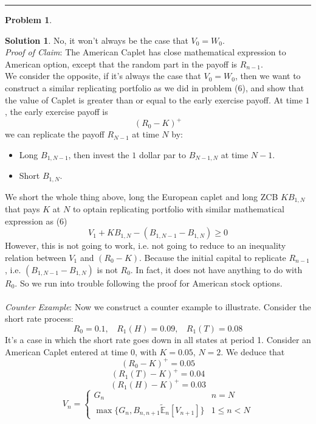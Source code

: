 \documentclass[a4paper, 10pt]{article}
\theoremstyle{definition}
\newtheorem{problem}{Problem}
\theoremstyle{hSol}
\newtheorem*{solution}{Solution}
\begin{document}
\noindent\rule{16cm}{0.4pt}
\begin{problem} 
\end{problem}
\begin{solution} No, it won't always be the case that $V_0=W_0$. \\
\textit{Proof of Claim}: The American Caplet has close mathematical expression to American option, except that the random part in the payoff is $R_{n-1}$.\\
We consider the opposite, if it's always the case that $V_0=W_0$, then we want to construct a similar replicating portfolio as we did in problem (6), and show that the value of Caplet is greater than or equal to the early exercise payoff. At time $1$, the early exercise payoff is
$$
(R_0 - K)^+
$$
we can replicate the payoff $R_{N-1}$ at time $N$ by:
\begin{itemize}
  \item Long $B_{1,N-1}$, then invest the $1$ dollar par to $B_{N-1,N}$ at time $N-1$.
  \item Short $B_{1,N}$.
\end{itemize}
We short the whole thing above, long the European caplet and long ZCB $KB_{1,N}$ that pays $K$ at $N$ to optain replicating portfolio with similar mathematical expression as (6)
$$
V_1 + KB_{1,N} - (B_{1,N-1}-B_{1,N}) \geq 0
$$
However, this is not going to work, i.e. not going to reduce to an inequality relation between $V_1$ and $(R_0 - K)$. Because the initial capital to replicate $R_{n-1}$, i.e. $(B_{1,N-1}-B_{1,N})$ is not $R_0$. In fact, it does not have anything to do with $R_0$. So we run into trouble following the proof for American stock options.\\
~\\
\textit{Counter Example}: Now we construct a counter example to illustrate. Consider the short rate process:
$$
R_0 = 0.1,~~~~R_1(H) = 0.09,~~~~R_1(T) = 0.08
$$
It's a case in which the short rate goes down in all states at period 1. Consider an American Caplet entered at time $0$, with $K=0.05$, $N=2$. We deduce that
$$
(R_0-K)^+ = 0.05
$$
$$
(R_1(T)-K)^+ = 0.04
$$
$$
(R_1(H)-K)^+ = 0.03
$$
$$
V_{n} = 
\begin{cases}
G_n & n=N\\
\max\{G_n, B_{n,n+1}\tilde{\mathbb{E}}_n\left[V_{n+1}\right]\} & 1\leq n<N
\end{cases}
$$


\end{solution}
\end{document}
